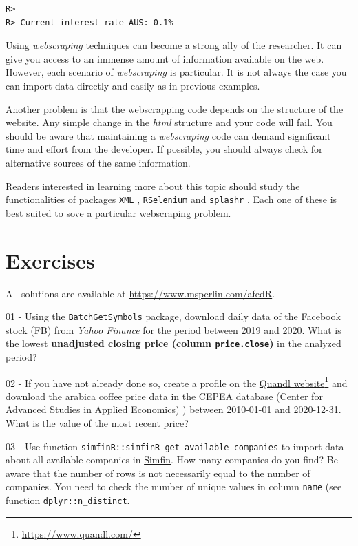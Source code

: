 \documentclass[
  12pt,
]{book}
\begin{document}
\begin{verbatim}
R> 
R> Current interest rate AUS: 0.1%
\end{verbatim}

Using \emph{webscraping} techniques can become a strong ally of the researcher. It can give you access to an immense amount of information available on the web. However, each scenario of \emph{webscraping} is particular. It is not always the case you can import data directly and easily as in previous examples.

Another problem is that the webscrapping code depends on the structure of the website. Any simple change in the \emph{html} structure and your code will fail. You should be aware that maintaining a \emph{webscraping} code can demand significant time and effort from the developer. If possible, you should always check for alternative sources of the same information.

Readers interested in learning more about this topic should study the functionalities of packages \texttt{XML} \citep{R-XML}, \texttt{RSelenium} \citep{R-RSelenium} and \texttt{splashr} \citep{R-splashr}. Each one of these is best suited to sove a particular webscraping problem.    

\hypertarget{exercises-2}{%
\section{Exercises}\label{exercises-2}}

All solutions are available at \url{https://www.msperlin.com/afedR}.

01 -
Using the \texttt{BatchGetSymbols} package, download daily data of the Facebook stock (FB) from \emph{Yahoo Finance} for the period between 2019 and 2020. What is the lowest \textbf{unadjusted closing price (column \texttt{price.close})} in the analyzed period?

02 -
If you have not already done so, create a profile on the \href{https://www.quandl.com/}{Quandl website}\footnote{\url{https://www.quandl.com/}} and download the arabica coffee price data in the CEPEA database (Center for Advanced Studies in Applied Economics) ) between 2010-01-01 and 2020-12-31. What is the value of the most recent price?

03 -
Use function \texttt{simfinR::simfinR\_get\_available\_companies} to import data about all available companies in \href{https://simfin.com}{Simfin}. How many companies do you find? Be aware that the number of rows is not necessarily equal to the number of companies. You need to check the number of unique values in column \texttt{name} (see function \texttt{dplyr::n\_distinct}.
\end{document}
